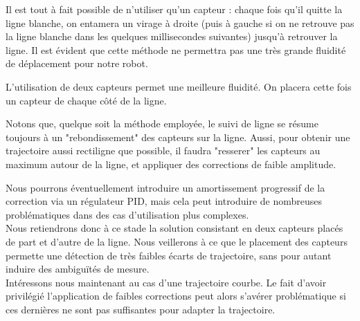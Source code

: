 		Il est tout à fait possible de n'utiliser qu'un capteur : chaque fois qu'il quitte la ligne blanche, on entamera un virage à droite (puis à gauche si on ne retrouve pas la ligne blanche dans les quelques millisecondes suivantes) jusqu'à retrouver la ligne. Il est évident que cette méthode ne permettra pas une très grande fluidité de déplacement pour notre robot.


		L'utilisation de deux capteurs permet une meilleure fluidité. On placera cette fois un capteur de chaque côté de la ligne.


		Notons que, quelque soit la méthode employée, le suivi de ligne se résume toujours à un "rebondissement" des capteurs sur la ligne. Aussi, pour obtenir une trajectoire aussi rectiligne que possible, il faudra "resserer" les capteurs au maximum autour de la ligne, et appliquer des corrections de faible amplitude.


		Nous pourrons éventuellement introduire un amortissement progressif de la correction via un régulateur PID, mais cela peut introduire de nombreuses problématiques dans des cas d'utilisation plus complexes.\\

		Nous retiendrons donc à ce stade la solution consistant en deux capteurs placés de part et d'autre de la ligne. Nous veillerons à ce que le placement des capteurs permette une détection de très faibles écarts de trajectoire, sans pour autant induire des ambiguïtés de mesure.\\

		Intéressons nous maintenant au cas d'une trajectoire courbe. Le fait d'avoir privilégié l'application de faibles corrections peut alors s'avérer problématique si ces dernières ne sont pas suffisantes pour adapter la trajectoire.


